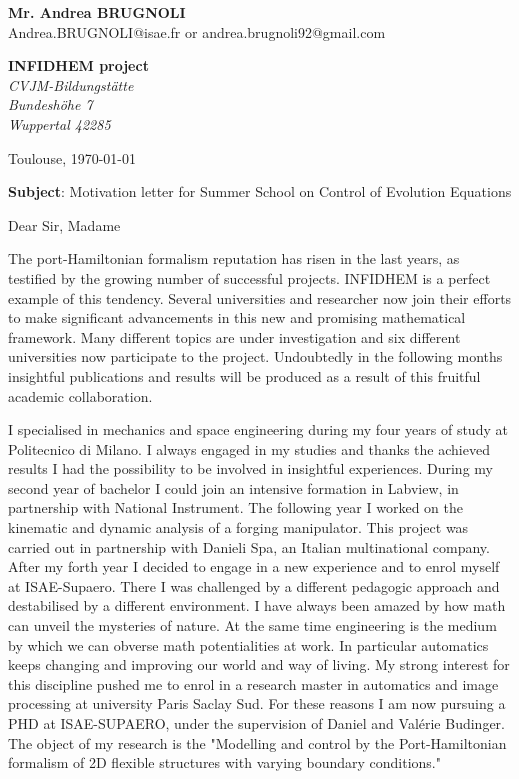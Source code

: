 \documentclass[11pt]{letter}
\begin{document}
 \begin{flushleft}
 {\bfseries Mr. Andrea \textsc{BRUGNOLI}}\\[.35ex]
 Andrea.BRUGNOLI@isae.fr or andrea.brugnoli92@gmail.com
 \end{flushleft}
 \begin{flushright}
 {\bfseries INFIDHEM project}\\[.35ex]
 \small\itshape
 CVJM-Bildungstätte \\
Bundeshöhe 7 \\
Wuppertal 42285
 \end{flushright}
 \begin{flushright}
 Toulouse, \today 
 \end{flushright}
 \textbf{Subject}: Motivation letter for Summer School on Control of Evolution Equations

 Dear Sir, Madame

The port-Hamiltonian formalism reputation has risen in the last years, as testified by the growing number of successful projects. INFIDHEM is a perfect example of this tendency. Several universities and researcher now join their efforts to make significant advancements in this new and promising mathematical framework. Many different topics are under investigation and six different universities now participate to the project. Undoubtedly in the following months insightful publications and results will be produced as a result of this fruitful academic collaboration.

 I specialised in mechanics and space engineering during my four years of study at Politecnico di Milano. I always engaged in my studies and thanks the achieved results I had the possibility to be involved in insightful experiences. During my second year of bachelor I could join an intensive formation in Labview, in partnership with National Instrument. The following year I worked on the kinematic and dynamic analysis of a forging manipulator. This project was carried out in partnership with Danieli Spa, an Italian multinational company.  After my forth year I decided to engage in a new experience and to enrol myself at ISAE-Supaero. There I was challenged by a different pedagogic approach and destabilised by a different environment.  I have always been amazed by how math can unveil the mysteries of nature. At the same time engineering is the medium by which we can obverse math potentialities at work. In particular automatics keeps changing and improving our world  and way of living. My strong interest for this discipline pushed me to enrol in a research master in automatics and image processing at university Paris Saclay Sud. For these reasons I am now pursuing a PHD at ISAE-SUPAERO, under the supervision of Daniel and Valérie Budinger. The object of my research is the "Modelling and control by the Port-Hamiltonian formalism of 2D flexible structures with varying boundary conditions."
\end{document}
